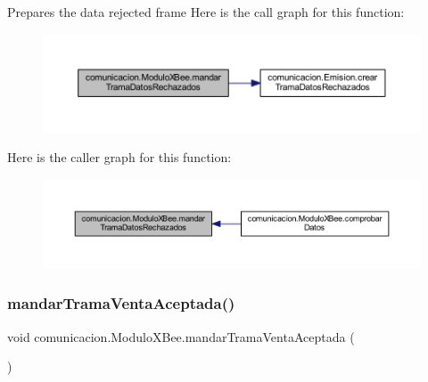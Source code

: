 Prepares the data rejected frame Here is the call graph for this function\+:
\nopagebreak
\begin{figure}[H]
\begin{center}
\leavevmode
\includegraphics[width=350pt]{classcomunicacion_1_1_modulo_x_bee_ac996e20c06c0e1c33f868e33d13f083b_cgraph}
\end{center}
\end{figure}
Here is the caller graph for this function\+:
\nopagebreak
\begin{figure}[H]
\begin{center}
\leavevmode
\includegraphics[width=350pt]{classcomunicacion_1_1_modulo_x_bee_ac996e20c06c0e1c33f868e33d13f083b_icgraph}
\end{center}
\end{figure}
\mbox{\label{classcomunicacion_1_1_modulo_x_bee_a71bbc67392676c9e0bd57813a87d06c0}} 
\subsubsection{\texorpdfstring{mandar\+Trama\+Venta\+Aceptada()}{mandarTramaVentaAceptada()}}
{\footnotesize\ttfamily void comunicacion.\+Modulo\+X\+Bee.\+mandar\+Trama\+Venta\+Aceptada (\begin{DoxyParamCaption}{ }\end{DoxyParamCaption})}

